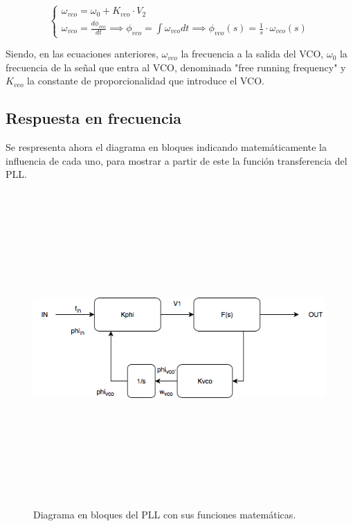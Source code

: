 	\begin{equation}
		\begin{cases}
			\omega_{vco} =\omega_0 + K_{vco} \cdot V_2\\
			\omega_{vco} = \frac{d \phi_{vco}}{dt} \implies \phi_{vco} = \int \omega_{vco} dt \implies \phi_{vco}(s) = \frac{1}{s} \cdot \omega_{vco}(s)
		\end{cases}
	\end{equation}
	
	Siendo, en las ecuaciones anteriores, $\omega_{vco}$ la frecuencia a la salida del VCO, $\omega_0$ la frecuencia de la señal que entra al VCO, denominada "free running frequency" y $K_{vco}$ la constante de proporcionalidad que introduce el VCO.
	
	
\subsection{Respuesta en frecuencia}

Se respresenta ahora el diagrama en bloques indicando matem\'aticamente la influencia de cada uno, para mostrar a partir de este la funci\'on transferencia del PLL.

\begin{figure}[H] %
	\centering
	\includegraphics[width=12cm,height=12cm,keepaspectratio]{../EJ2/imagenes/transf.png}
	\caption{Diagrama en bloques del PLL con sus funciones matem\'aticas.}
	\label{pll2}
\end{figure}

